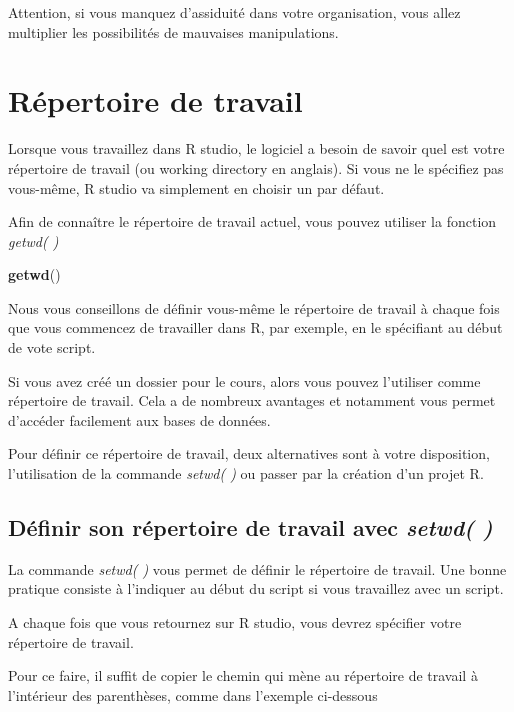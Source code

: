 \documentclass[
]{book}
\newenvironment{Shaded}{\begin{snugshade}}{\end{snugshade}}
\newcommand{\FunctionTok}[1]{\textcolor[rgb]{0.13,0.29,0.53}{\textbf{#1}}}
\newcommand{\NormalTok}[1]{#1}
\begin{document}
Attention, si vous manquez d'assiduité dans votre organisation, vous allez multiplier les possibilités de mauvaises manipulations.

\section{Répertoire de travail}\label{ruxe9pertoire-de-travail}

Lorsque vous travaillez dans R studio, le logiciel a besoin de savoir quel est votre répertoire de travail (ou working directory en anglais). Si vous ne le spécifiez pas vous-même, R studio va simplement en choisir un par défaut.

Afin de connaître le répertoire de travail actuel, vous pouvez utiliser la fonction \emph{getwd( )}

\begin{Shaded}
\begin{Highlighting}[]
\FunctionTok{getwd}\NormalTok{()}
\end{Highlighting}
\end{Shaded}

Nous vous conseillons de définir vous-même le répertoire de travail à chaque fois que vous commencez de travailler dans R, par exemple, en le spécifiant au début de vote script.

Si vous avez créé un dossier pour le cours, alors vous pouvez l'utiliser comme répertoire de travail. Cela a de nombreux avantages et notamment vous permet d'accéder facilement aux bases de données.

Pour définir ce répertoire de travail, deux alternatives sont à votre disposition, l'utilisation de la commande \emph{setwd( )} ou passer par la création d'un projet R.

\subsection{\texorpdfstring{Définir son répertoire de travail avec \emph{setwd( )}}{Définir son répertoire de travail avec setwd( )}}\label{duxe9finir-son-ruxe9pertoire-de-travail-avec-setwd}

La commande \emph{setwd( )} vous permet de définir le répertoire de travail. Une bonne pratique consiste à l'indiquer au début du script si vous travaillez avec un script.

A chaque fois que vous retournez sur R studio, vous devrez spécifier votre répertoire de travail.

Pour ce faire, il suffit de copier le chemin qui mène au répertoire de travail à l'intérieur des parenthèses, comme dans l'exemple ci-dessous
\end{document}
